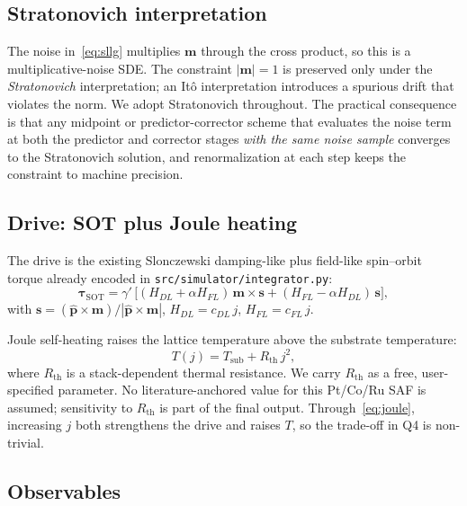 \documentclass[11pt,a4paper]{article}
\newcommand{\mb}[1]{\mathbf{#1}}
\newcommand{\Rth}{R_{\text{th}}}
\newcommand{\jcur}{j}
\begin{document}
\subsection{Stratonovich interpretation}

The noise in~\eqref{eq:sllg} multiplies $\mb{m}$ through the cross
product, so this is a multiplicative-noise SDE. The constraint
$|\mb{m}|=1$ is preserved only under the \emph{Stratonovich}
interpretation; an It\^{o} interpretation introduces a spurious drift
that violates the norm. We adopt Stratonovich throughout. The
practical consequence is that any midpoint or predictor-corrector
scheme that evaluates the noise term at both the predictor and
corrector stages \emph{with the same noise sample} converges to the
Stratonovich solution, and renormalization at each step keeps the
constraint to machine precision.

\subsection{Drive: SOT plus Joule heating}

The drive is the existing Slonczewski damping-like plus field-like
spin--orbit torque already encoded in \texttt{src/simulator/integrator.py}:
%
\begin{equation}
\bm{\tau}_{\text{SOT}} =
\gamma'\, \big[ (H_{DL} + \alpha H_{FL})\, \mb{m} \times \mb{s}
+ (H_{FL} - \alpha H_{DL})\, \mb{s} \big],
\end{equation}
%
with $\mb{s} = (\hat{\mb{p}} \times \mb{m})/|\hat{\mb{p}} \times \mb{m}|$,
$H_{DL} = c_{DL}\, \jcur$, $H_{FL} = c_{FL}\, \jcur$.

Joule self-heating raises the lattice temperature above the substrate
temperature:
%
\begin{equation}\label{eq:joule}
T(\jcur) = T_{\text{sub}} + \Rth\, \jcur^2,
\end{equation}
%
where $\Rth$ is a stack-dependent thermal resistance. We carry $\Rth$
as a free, user-specified parameter. No literature-anchored value for
this Pt/Co/Ru SAF is assumed; sensitivity to $\Rth$ is part of the
final output. Through~\eqref{eq:joule}, increasing $\jcur$ both
strengthens the drive and raises $T$, so the trade-off in Q4 is
non-trivial.

\subsection{Observables}
\end{document}
